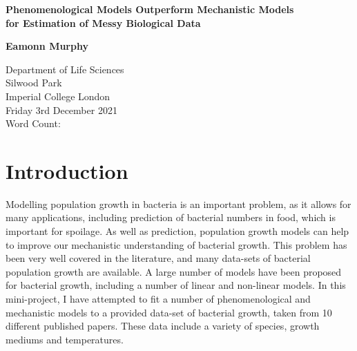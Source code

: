 \documentclass[11pt,a4wide,titlepage]{article}
\begin{document}
\begin{titlepage}
	\begin{center}
		\vspace*{1cm}
		
		\begin{Large}
			\textbf{Phenomenological Models Outperform Mechanistic Models\\
				for Estimation of Messy Biological Data}
		\end{Large}
		
		
		\vspace{1.5cm}
		
		\textbf{Eamonn Murphy}
		
		\vfill
		
		Department of Life Sciences\\
		Silwood Park\\
		Imperial College London\\
		\vspace{\baselineskip}
		Friday 3rd December 2021\\
		\vspace{\baselineskip}
		Word Count: 
		\vfill
		
	\end{center}
\end{titlepage}

\section*{Introduction}
Modelling population growth in bacteria is an important problem, as it allows for many applications, including prediction of bacterial numbers in food, which is important for spoilage. As well as prediction, population growth models can help to improve our mechanistic understanding of bacterial growth. This problem has been very well covered in the literature, and many data-sets of bacterial population growth are available. A large number of models have been proposed for bacterial growth, including a number of linear and non-linear models. In this mini-project, I have attempted to fit a number of phenomenological and mechanistic models to a provided data-set of bacterial growth, taken from 10 different published papers. These data include a variety of species, growth mediums and temperatures.
\end{document}
